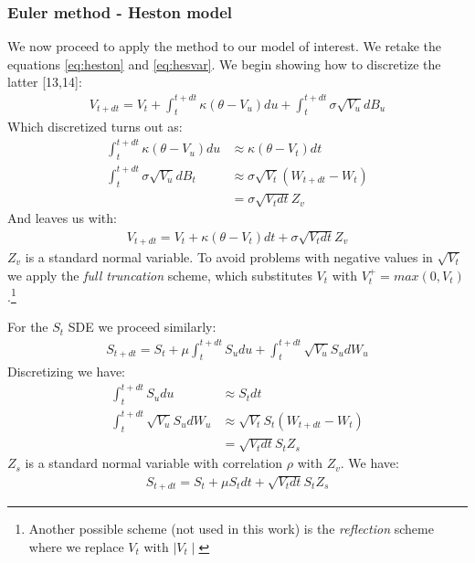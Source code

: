 \documentclass[12pt,twoside]{reedthesis}
\theoremstyle{definition}
\theoremstyle{definition}
\theoremstyle{remark}
\begin{document}
  \subsubsection{Euler method - Heston
  model}\label{euler-method---heston-model}
  
  We now proceed to apply the method to our model of interest. We retake
  the equations \eqref{eq:heston} and \eqref{eq:hesvar}. We begin showing how
  to discretize the latter {[}13,14{]}:
  \begin{align}
  \label{eq:hesvareuler}
  V_{t+dt} = V_t+ \int_{t}^{t+dt}{\kappa (\theta - V_u) du} + \int_{t}^{t+dt}{\sigma \sqrt{V_u} dB_u}
  \end{align}
  Which discretized turns out as:
  \begin{align*}
   \int_{t}^{t+dt}{\kappa (\theta - V_u)} du &\approx \kappa (\theta - V_t) dt\\
   \int_{t}^{t+dt}{\sigma \sqrt{V_u}} dB_t &\approx \sigma \sqrt{V_t} (W_{t+dt}-W_t)\\
  &= \sigma \sqrt{V_t dt} Z_v
  \end{align*}
  And leaves us with:
  \begin{align}
  V_{t+dt} = V_t + \kappa (\theta - V_t) dt + \sigma \sqrt{V_t dt} Z_v
  \end{align}
  \(Z_v\) is a standard normal variable. To avoid problems with negative
  values in \(\sqrt{V_t}\) we apply the \emph{full truncation} scheme,
  which substitutes \(V_t\) with \(V_t^+ = max(0, V_t)\).\footnote{Another
    possible scheme (not used in this work) is the \emph{reflection}
    scheme where we replace \(V_t\) with \(\mid V_t \mid\)}
  
  For the \(S_t\) SDE we proceed similarly:
  \begin{align}
  \label{eq:heseuler}
  S_{t+dt} = S_t+ \mu \int_{t}^{t+dt}{ S_u du} + \int_{t}^{t+dt}{\sqrt{V_u} S_u dW_u}
  \end{align}
  Discretizing we have:
  \begin{align*}
   \int_{t}^{t+dt}{S_u} du &\approx S_t dt\\
   \int_{t}^{t+dt}{\sqrt{V_u} S_u} dW_u &\approx \sqrt{V_t} S_t (W_{t+dt}-W_t)\\
  &= \sqrt{V_t dt} S_t Z_s
  \end{align*}
  \(Z_s\) is a standard normal variable with correlation \(\rho\) with
  \(Z_v\). We have:
  \begin{align}
  S_{t+dt} = S_t + \mu S_t dt + \sqrt{V_t dt} S_t Z_s
  \end{align}
\end{document}
